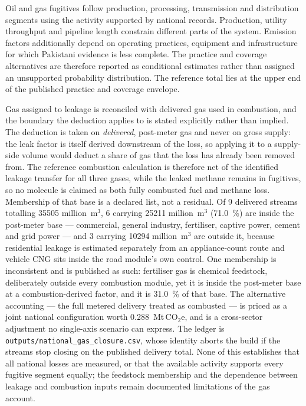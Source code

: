 \documentclass[essd]{copernicus}
\begin{document}
Oil and gas fugitives follow production, processing, transmission and distribution segments using the activity supported by national records. Production, utility throughput and pipeline length constrain different parts of the system. Emission factors additionally depend on operating practices, equipment and infrastructure for which Pakistani evidence is less complete. The practice and coverage alternatives are therefore reported as conditional estimates rather than assigned an unsupported probability distribution. The reference total lies at the upper end of the published practice and coverage envelope.

Gas assigned to leakage is reconciled with delivered gas used in combustion, and the boundary the deduction applies to is stated explicitly rather than implied. The deduction is taken on \emph{delivered}, post-meter gas and never on gross supply: the leak factor is itself derived downstream of the loss, so applying it to a supply-side volume would deduct a share of gas that the loss has already been removed from. The reference combustion calculation is therefore net of the identified leakage transfer for all three gases, while the leaked methane remains in fugitives, so no molecule is claimed as both fully combusted fuel and methane loss. Membership of that base is a declared list, not a residual. Of \num{9} delivered streams totalling \SI{35505}{} million~m$^3$, \num{6} carrying \SI{25211}{} million~m$^3$ (\SI{71.0}{\percent}) are inside the post-meter base --- commercial, general industry, fertiliser, captive power, cement and grid power --- and \num{3} carrying \SI{10294}{} million~m$^3$ are outside it, because residential leakage is estimated separately from an appliance-count route and vehicle CNG sits inside the road module's own control. One membership is inconsistent and is published as such: fertiliser gas is chemical feedstock, deliberately outside every combustion module, yet it is inside the post-meter base at a combustion-derived factor, and it is \SI{31.0}{\percent} of that base. The alternative accounting --- the full metered delivery treated as combusted --- is priced as a joint national configuration worth \SI{0.288}{\mega\tonne}\,CO$_2$e, and is a cross-sector adjustment no single-axis scenario can express. The ledger is \texttt{outputs/national\_gas\_closure.csv}, whose identity aborts the build if the streams stop closing on the published delivery total. None of this establishes that all national losses are measured, or that the available activity supports every fugitive segment equally; the feedstock membership and the dependence between leakage and combustion inputs remain documented limitations of the gas account.
\end{document}
